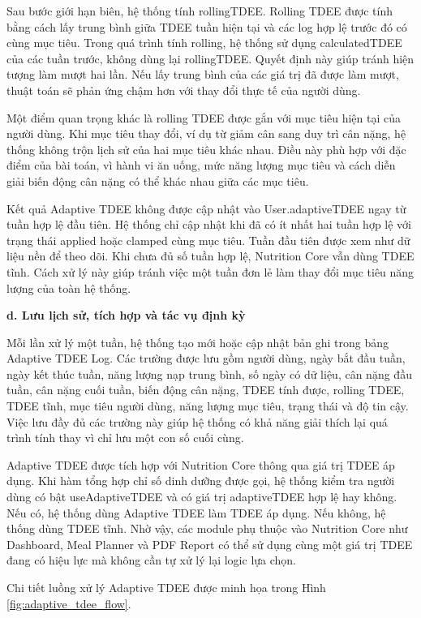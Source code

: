\documentclass[12pt, a4paper]{report}
\begin{document}
Sau bước giới hạn biên, hệ thống tính rollingTDEE. Rolling TDEE được tính bằng cách lấy trung bình giữa TDEE tuần hiện tại và các log hợp lệ trước đó có cùng mục tiêu. Trong quá trình tính rolling, hệ thống sử dụng calculatedTDEE của các tuần trước, không dùng lại rollingTDEE. Quyết định này giúp tránh hiện tượng làm mượt hai lần. Nếu lấy trung bình của các giá trị đã được làm mượt, thuật toán sẽ phản ứng chậm hơn với thay đổi thực tế của người dùng.

Một điểm quan trọng khác là rolling TDEE được gắn với mục tiêu hiện tại của người dùng. Khi mục tiêu thay đổi, ví dụ từ giảm cân sang duy trì cân nặng, hệ thống không trộn lịch sử của hai mục tiêu khác nhau. Điều này phù hợp với đặc điểm của bài toán, vì hành vi ăn uống, mức năng lượng mục tiêu và cách diễn giải biến động cân nặng có thể khác nhau giữa các mục tiêu.

Kết quả Adaptive TDEE không được cập nhật vào User.adaptiveTDEE ngay từ tuần hợp lệ đầu tiên. Hệ thống chỉ cập nhật khi đã có ít nhất hai tuần hợp lệ với trạng thái applied hoặc clamped cùng mục tiêu. Tuần đầu tiên được xem như dữ liệu nền để theo dõi. Khi chưa đủ số tuần hợp lệ, Nutrition Core vẫn dùng TDEE tĩnh. Cách xử lý này giúp tránh việc một tuần đơn lẻ làm thay đổi mục tiêu năng lượng của toàn hệ thống.

\textbf{d. Lưu lịch sử, tích hợp và tác vụ định kỳ}

Mỗi lần xử lý một tuần, hệ thống tạo mới hoặc cập nhật bản ghi trong bảng Adaptive TDEE Log. Các trường được lưu gồm người dùng, ngày bắt đầu tuần, ngày kết thúc tuần, năng lượng nạp trung bình, số ngày có dữ liệu, cân nặng đầu tuần, cân nặng cuối tuần, biến động cân nặng, TDEE tính được, rolling TDEE, TDEE tĩnh, mục tiêu người dùng, năng lượng mục tiêu, trạng thái và độ tin cậy. Việc lưu đầy đủ các trường này giúp hệ thống có khả năng giải thích lại quá trình tính thay vì chỉ lưu một con số cuối cùng.

Adaptive TDEE được tích hợp với Nutrition Core thông qua giá trị TDEE áp dụng. Khi hàm tổng hợp chỉ số dinh dưỡng được gọi, hệ thống kiểm tra người dùng có bật useAdaptiveTDEE và có giá trị adaptiveTDEE hợp lệ hay không. Nếu có, hệ thống dùng Adaptive TDEE làm TDEE áp dụng. Nếu không, hệ thống dùng TDEE tĩnh. Nhờ vậy, các module phụ thuộc vào Nutrition Core như Dashboard, Meal Planner và PDF Report có thể sử dụng cùng một giá trị TDEE đang có hiệu lực mà không cần tự xử lý lại logic lựa chọn.

Chi tiết luồng xử lý Adaptive TDEE được minh họa trong Hình \ref{fig:adaptive_tdee_flow}.
\end{document}
